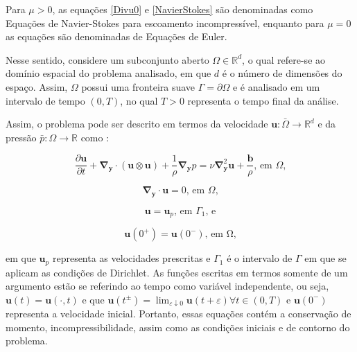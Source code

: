 \documentclass[_ArquivoPrincipal.tex]{subfiles}
\begin{document}
Para $\mu>0$, as equações \ref{Divu0} e \ref{NavierStokes} são denominadas como Equações de Navier-Stokes para escoamento incompressível, enquanto para $\mu=0$ as equações são denominadas de Equações de Euler.

Nesse sentido, considere um subconjunto aberto $\Omega\in\mathbb{R}^d$, o qual refere-se ao domínio espacial do problema analisado, em que $d$ é o número de dimensões do espaço. Assim, $\Omega$ possui uma fronteira suave $\Gamma=\partial\Omega$ e é analisado em um intervalo de tempo $(0,T)$, no qual $T>0$ representa o tempo final da análise.

Assim, o problema pode ser descrito em termos da velocidade $\mathbf{u}:\bar{\Omega}\to\mathbb{R}^d$ e da pressão $\bar{p}:\Omega\to\mathbb{R}$ como \cite{hughes2000large}:

\begin{equation}
    \frac{\partial\mathbf{u}}{\partial t}+\mathbf{\nabla}_\mathbf{y}\cdot(\mathbf{u}\otimes\mathbf{u})+\frac{1}{\rho}\mathbf{\nabla}_\mathbf{y}p=\nu\mathbf{\nabla}^2_\mathbf{y}\mathbf{u}+\frac{\mathbf{b}}{\rho}\text{, em }\Omega\text{,}
    \label{Sist1}
\end{equation}

\begin{equation}
    \mathbf{\nabla}_\mathbf{y}\cdot\mathbf{u}=0\text{, em }\Omega\text{,}
    \label{Sist2}
\end{equation}

\begin{equation}
    \mathbf{u}=\mathbf{u}_p\text{, em }\Gamma_1\text{, e}
    \label{Sist3}
\end{equation}

\begin{equation}
    \mathbf{u}(0^+)=\mathbf{u}(0^-)\text{, em }\mathrm{\Omega}\text{,}
    \label{Sist4}
\end{equation}

\noindent em que $\mathbf{u}_p$ representa as velocidades prescritas e $\Gamma_1$ é o intervalo de $\Gamma$ em que se aplicam as condições de Dirichlet. As funções escritas em termos somente de um argumento estão se referindo ao tempo como variável independente, ou seja, $\mathbf{u}(t)=\mathbf{u}(\cdot,t)$ e que $\mathbf{u}(t^\pm)=\lim_{\varepsilon\downarrow0}{\mathbf{u}(t+\varepsilon)\forall t\in(0,T)}$ e $\mathbf{u}(0^-)$ representa a velocidade inicial. Portanto, essas equações contém a conservação de momento, incompressibilidade, assim como as condições iniciais e de contorno do problema.
\end{document}
